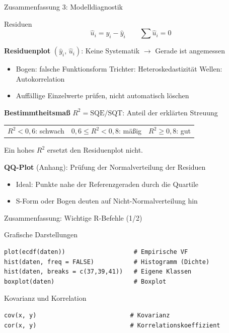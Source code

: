 \documentclass[aspectratio=169,11pt]{beamer}
\begin{document}
\begin{frame}{Zusammenfassung 3: Modelldiagnostik}
  \begin{block}{Residuen}
    \vspace{-0.3cm}
    \[ \hat{u}_i = y_i - \hat{y}_i \qquad \textstyle\sum \hat{u}_i = 0 \]
  \end{block}

  \textbf{Residuenplot} $(\hat{y}_i,\,\hat{u}_i)$: Keine Systematik $\to$ Gerade ist angemessen
  \begin{itemize}
    \item Bogen: falsche Funktionsform \quad Trichter: Heteroskedastizität \quad
          Wellen: Autokorrelation
    \item Auffällige Einzelwerte prüfen, nicht automatisch löschen
  \end{itemize}

  \vspace{0.15cm}

  \textbf{Bestimmtheitsmaß} $R^{2} = \text{SQE}/\text{SQT}$: Anteil der erklärten Streuung
  \begin{center}
    \begin{tabular}{ccc}
      $R^2 < 0{,}6$: schwach & $0{,}6 \le R^2 < 0{,}8$: mäßig & $R^2 \ge 0{,}8$: gut
    \end{tabular}
  \end{center}
  \vspace{-0.15cm}
  Ein hohes $R^{2}$ ersetzt den Residuenplot nicht.

  \vspace{0.15cm}

  \textbf{QQ-Plot} (Anhang): Prüfung der Normalverteilung der Residuen
  \begin{itemize}
    \item Ideal: Punkte nahe der Referenzgeraden durch die Quartile
    \item S-Form oder Bogen deuten auf Nicht-Normalverteilung hin
  \end{itemize}
\end{frame}

\begin{frame}[fragile]{Zusammenfassung: Wichtige R-Befehle (1/2)}
  \begin{block}{Grafische Darstellungen}
    \begin{lstlisting}
plot(ecdf(daten))                   # Empirische VF
hist(daten, freq = FALSE)           # Histogramm (Dichte)
hist(daten, breaks = c(37,39,41))   # Eigene Klassen
boxplot(daten)                      # Boxplot
\end{lstlisting}
  \end{block}

  \vspace{0.3cm}

  \begin{block}{Kovarianz und Korrelation}
    \begin{lstlisting}
cov(x, y)                          # Kovarianz
cor(x, y)                          # Korrelationskoeffizient
\end{lstlisting}
  \end{block}
\end{frame}
\end{document}
